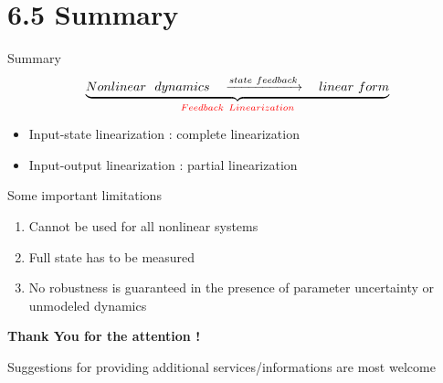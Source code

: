 \documentclass{beamer}
\begin{document}
\section{6.5  Summary}

\begin{frame}{Summary}
    $$
    \underbrace{Nonlinear~~dynamics \quad \xrightarrow{state~feedback} \quad linear~form }_{\color{red}\large{Feedback ~Linearization}}
    $$
    \begin{itemize}
      \item {\color{red}Input-state linearization} : complete linearization
      \item {\color{red}Input-output linearization} : partial linearization
    \end{itemize}
    
    Some important limitations
    \begin{enumerate}
      \item Cannot be used for all nonlinear systems
      \item Full state has to be measured
      \item No robustness is guaranteed in the presence of parameter uncertainty or unmodeled dynamics
    \end{enumerate}
\end{frame}

\begin{frame}[c]
       \centering
       \textbf{\Large Thank You for the attention !}
    
    \vspace{+30pt}
    \centering
       {\footnotesize Suggestions for providing additional services/informations are most welcome}
\end{frame}
\end{document}
